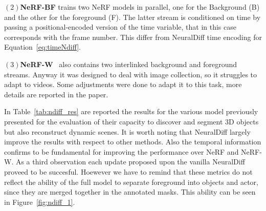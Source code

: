 $(2)$\textbf{NeRF-BF} trains two NeRF models in parallel, one for the Background (B) and the
other for the foreground (F). The latter stream is conditioned on time by passing a
positional-encoded version of the time variable, that in this case corresponds with 
the frame number. This differ from NeuralDiff time encoding for Equation~\ref{eq:timeNdiff}.

$(3)$\textbf{NeRF-W}~\cite{ndiff_17} also contains two interlinked background and foreground
streams. Anyway it was designed to deal with image collection, so it struggles to 
adapt to videos. Some adjustments were done to adapt it to this task, more details
are reported in the paper.

In Table~\ref{tab:ndiff_res} are reported the results for the various model previously
presented for the evaluation of their capacity to discover and segment 3D objects
but also reconstruct dynamic scenes. It is worth noting that NeuralDiff largely improve
the results with respect to other methods. Also the temporal information confirms to 
be fundamental for improving the performance over NeRF and NeRF-W. As a third observation
each update proposed upon the vanilla NeuralDiff proveed to be succesful. Hoewever
we have to remind that these metrics do not reflect the ability of the full model to 
separate foreground into objects and actor, since they are merged together in 
the annotated masks. This ability can be seen in Figure~\ref{fig:ndiff_1}.


